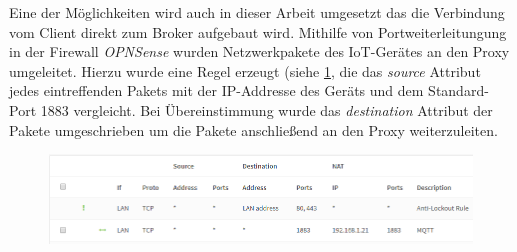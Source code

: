     Eine der Möglichkeiten wird auch in dieser Arbeit umgesetzt das die Verbindung vom Client direkt zum Broker aufgebaut wird.
    Mithilfe von Portweiterleitungung in der Firewall \emph{OPNSense} wurden Netzwerkpakete des \ac{IoT}-Gerätes an den Proxy umgeleitet. Hierzu wurde eine Regel erzeugt (siehe \ref{fig:firewall_rule}, die das \emph{source} Attribut jedes eintreffenden Pakets mit der IP-Addresse des Geräts und dem Standard-Port 1883 vergleicht. Bei Übereinstimmung wurde das \emph{destination} Attribut der Pakete umgeschrieben um die Pakete anschließend an den Proxy weiterzuleiten.
    \begin{figure}[h]%
        \centering
        \includegraphics[width=14cm]{tex/bilder/5_implementierung/firewall.PNG}
        \label{fig:firewall_rule}
    \end{figure}